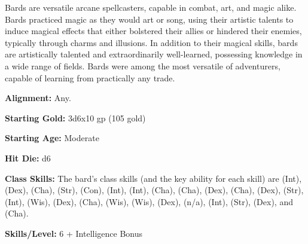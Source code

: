 
Bards are versatile arcane spellcasters, capable in combat, art, and magic alike. Bards practiced magic as they would art or song, using their artistic talents to induce magical effects that either bolstered their allies or hindered their enemies, typically through charms and illusions. In addition to their magical skills, bards are artistically talented and extraordinarily well-learned, possessing knowledge in a wide range of fields. Bards were among the most versatile of adventurers, capable of learning from practically any trade.

\textbf{Alignment:} Any.

\textbf{Starting Gold:} 3d6x10 gp (105 gold)

\textbf{Starting Age:} Moderate

\textbf{Hit Die:} d6

\textbf{Class Skills:} The bard's class skills (and the key ability for each skill) are  (Int),  (Dex),  (Cha),  (Str),  (Con),  (Int),  (Int),  (Cha),  (Cha),  (Dex),  (Cha),  (Dex),  (Str),  (Int),  (Wis),  (Dex),  (Cha),  (Wis),  (Wis),  (Dex),  (n/a),  (Int),  (Str),  (Dex), and  (Cha).

\textbf{Skills/Level:} 6 + Intelligence Bonus

\modebab{}
\poorfor{}
\goodref{}
\poorwil{}

